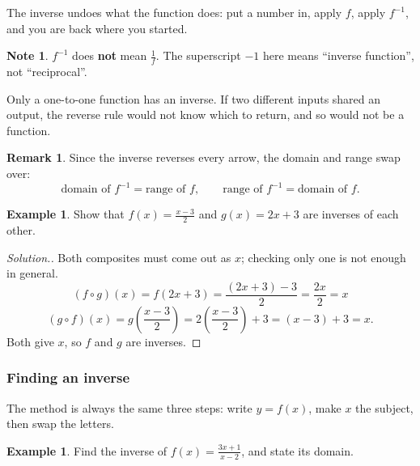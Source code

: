 \documentclass[11pt,a4paper]{article}
\theoremstyle{definition}
\newtheorem{example}[thm]{Example}
\newtheorem{note}[thm]{Note}
\newtheorem{remark}[thm]{Remark}
\newenvironment{solution}
  {\renewcommand{\qedsymbol}{}\begin{proof}[\textit{Solution}.]}
  {\end{proof}}
\begin{document}
The inverse undoes what the function does: put a number in, apply $f$, apply $f^{-1}$,
and you are back where you started.

\begin{note}
$f^{-1}$ does \textbf{not} mean $\frac{1}{f}$. The superscript $-1$ here means
``inverse function'', not ``reciprocal''.
\end{note}

Only a one-to-one function has an inverse. If two different inputs shared an output,
the reverse rule would not know which to return, and so would not be a function.

\begin{remark}
Since the inverse reverses every arrow, the domain and range swap over:
$$\text{domain of } f^{-1}=\text{range of } f,\qquad
\text{range of } f^{-1}=\text{domain of } f.$$
\end{remark}

\begin{example}
Show that $f(x)=\frac{x-3}{2}$ and $g(x)=2x+3$ are inverses of each other.
\end{example}

\begin{solution}
Both composites must come out as $x$; checking only one is not enough in general.
$$(f\circ g)(x)=f(2x+3)=\frac{(2x+3)-3}{2}=\frac{2x}{2}=x$$
$$(g\circ f)(x)=g\!\left(\frac{x-3}{2}\right)=2\!\left(\frac{x-3}{2}\right)+3=(x-3)+3=x.$$
Both give $x$, so $f$ and $g$ are inverses.
\end{solution}

\subsubsection{Finding an inverse}

The method is always the same three steps: write $y=f(x)$, make $x$ the subject, then
swap the letters.

\begin{example}
Find the inverse of $f(x)=\frac{3x+1}{x-2}$, and state its domain.
\end{example}
\end{document}
